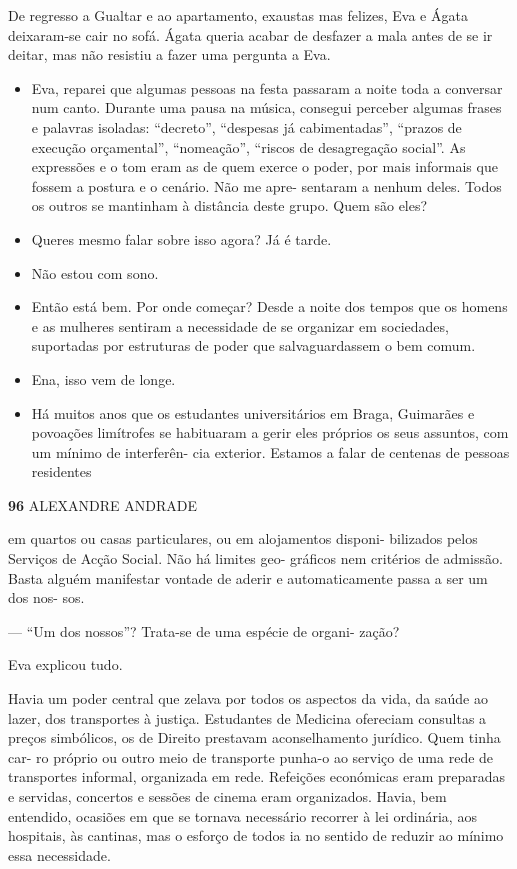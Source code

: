 De regresso a Gualtar e ao apartamento, exaustas mas felizes, Eva e
Ágata deixaram-se cair no sofá. Ágata queria acabar de desfazer a mala
antes de se ir deitar, mas não resistiu a fazer uma pergunta a Eva.

\begin{itemize}
\tightlist
\item
  Eva, reparei que algumas pessoas na festa passaram a noite toda a
  conversar num canto. Durante uma pausa na música, consegui perceber
  algumas frases e palavras isoladas: ``decreto'', ``despesas já
  cabimentadas'', ``prazos de execução orçamental'', ``nomeação'',
  ``riscos de desagregação social''. As expressões e o tom eram as de
  quem exerce o poder, por mais informais que fossem a postura e o
  cenário. Não me apre- sentaram a nenhum deles. Todos os outros se
  mantinham à distância deste grupo. Quem são eles?
\item
  Queres mesmo falar sobre isso agora? Já é tarde.
\item
  Não estou com sono.
\item
  Então está bem. Por onde começar? Desde a noite dos tempos que os
  homens e as mulheres sentiram a necessidade de se organizar em
  sociedades, suportadas por estruturas de poder que salvaguardassem o
  bem comum.
\item
  Ena, isso vem de longe.
\item
  Há muitos anos que os estudantes universitários em Braga, Guimarães e
  povoações limítrofes se habituaram a gerir eles próprios os seus
  assuntos, com um mínimo de interferên- cia exterior. Estamos a falar
  de centenas de pessoas residentes
\end{itemize}

\textbf{96 }ALEXANDRE ANDRADE

em quartos ou casas particulares, ou em alojamentos disponi- bilizados
pelos Serviços de Acção Social. Não há limites geo- gráficos nem
critérios de admissão. Basta alguém manifestar vontade de aderir e
automaticamente passa a ser um dos nos- sos.

--- ``Um dos nossos''? Trata-se de uma espécie de organi- zação?

Eva explicou tudo.

Havia um poder central que zelava por todos os aspectos da vida, da
saúde ao lazer, dos transportes à justiça. Estudantes de Medicina
ofereciam consultas a preços simbólicos, os de Direito prestavam
aconselhamento jurídico. Quem tinha car- ro próprio ou outro meio de
transporte punha-o ao serviço de uma rede de transportes informal,
organizada em rede. Refeições económicas eram preparadas e servidas,
concertos e sessões de cinema eram organizados. Havia, bem entendido,
ocasiões em que se tornava necessário recorrer à lei ordinária, aos
hospitais, às cantinas, mas o esforço de todos ia no sentido de reduzir
ao mínimo essa necessidade.

